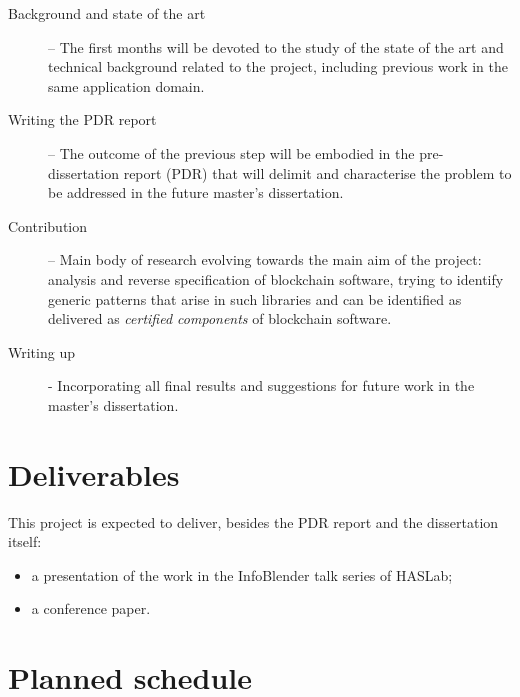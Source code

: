\documentclass[a4paper, 11pt]{article} %
\begin{document}
\begin{description}

\item[Background and state of the art] -- The first months will be devoted
to the study of the state of the art and technical background related to
the project, including previous work in the same application domain.

\item[Writing the PDR report] -- The outcome of the previous step will be
embodied in the pre-dissertation report (PDR) that will delimit and characterise
the problem to be addressed in the future master’s dissertation.

\item[Contribution] -- Main body of research evolving towards the main aim
of the project: analysis and reverse specification of blockchain software,
trying to identify generic patterns that arise in such libraries and can be
identified as delivered as \emph{certified components} of blockchain software.

\item[Writing up] - Incorporating all final results and suggestions for future
work in the master's dissertation.
\end{description}


\section*{Deliverables}

This project is expected to deliver, besides the PDR report and the dissertation itself:
\begin{itemize}
\item   a presentation of the work in the InfoBlender talk series of HASLab;
\item   a conference paper.
\end{itemize}

\section*{Planned schedule}
\end{document}
